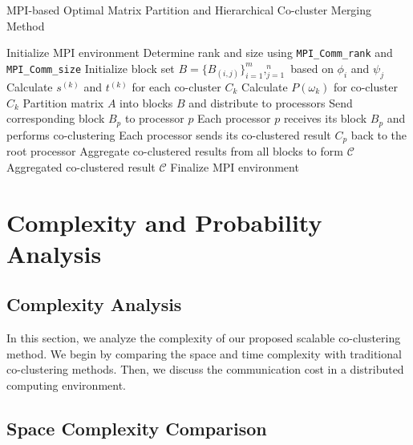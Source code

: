 \documentclass[journal]{IEEEtran}
\begin{document}
\begin{algorithm}[!t]
  \caption{MPI-based Optimal Matrix Partition and Hierarchical Co-cluster Merging Method}\label{alg:mpi_method}
  \begin{algorithmic}[1]
    \STATE Initialize MPI environment
    \STATE Determine rank and size using \texttt{MPI\_Comm\_rank} and \texttt{MPI\_Comm\_size}
    \STATE Initialize block set $B = \{B_{(i,j)}\}_{i=1}^m,_{j=1}^n$ based on $\phi_i$ and $\psi_j$
    \STATE Calculate $s^{(k)}$ and $t^{(k)}$ for each co-cluster $C_k$
    \STATE Calculate $P(\omega_k)$ for co-cluster $C_k$
    \STATE Partition matrix $A$ into blocks $B$ and distribute to processors
    \STATE Send corresponding block $B_p$ to processor $p$
    \ENDFOR
    \ENDIF
    \ENDFOR
    \ENDIF
    \STATE Each processor $p$ receives its block $B_p$ and performs co-clustering
    \STATE Each processor sends its co-clustered result $C_p$ back to the root processor
    \STATE Aggregate co-clustered results from all blocks to form $\mathcal{C}$
    \RETURN Aggregated co-clustered result $\mathcal{C}$
    \ENDIF
    \STATE Finalize MPI environment
  \end{algorithmic}
\end{algorithm}

\section{Complexity and Probability Analysis}
\label{sec:analysis}

\subsection{Complexity Analysis}
\label{subsec:complexity}
In this section, we analyze the complexity of our proposed scalable co-clustering method. We begin by comparing the space and time complexity with traditional co-clustering methods. Then, we discuss the communication cost in a distributed computing environment.

\subsection{Space Complexity Comparison}
\end{document}
